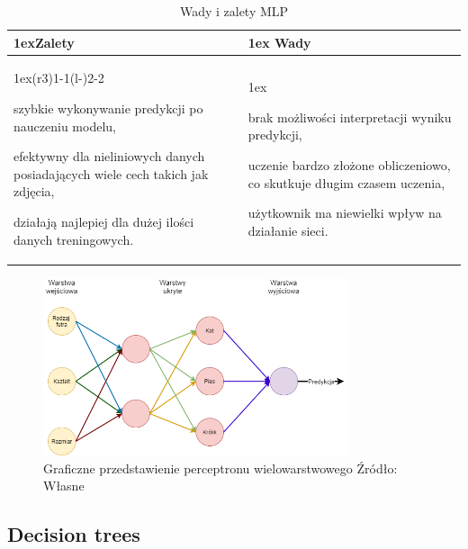 \begin{table}[h]
    \begin{tabularx}{\linewidth}{>{\parskip1ex}X@{\kern4\tabcolsep}>{\parskip1ex}X}
    \toprule
    \hfil\bfseries Zalety
    &
    \hfil\bfseries Wady
    \\\cmidrule(r{3\tabcolsep}){1-1}\cmidrule(l{-\tabcolsep}){2-2}
    
    szybkie wykonywanie predykcji po nauczeniu modelu,\par
    efektywny dla nieliniowych danych posiadających wiele cech takich jak zdjęcia,\par
    działają najlepiej dla dużej ilości danych treningowych.\par
    &
    
    brak możliwości interpretacji wyniku predykcji,\par
    uczenie bardzo złożone obliczeniowo, co skutkuje długim czasem uczenia,\par
    użytkownik ma niewielki wpływ na działanie sieci.\par
    \\\bottomrule
    \end{tabularx}
    \caption{Wady i zalety MLP}
\end{table}

\begin{figure}[H]
    \centering
    \includegraphics[width=0.8\textwidth]{./Img/MLP.png}
    \caption{Graficzne przedstawienie perceptronu wielowarstwowego Źródło: Własne}
\end{figure}

\subsection{Decision trees}

